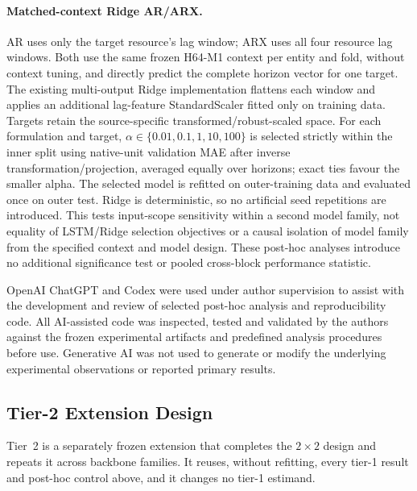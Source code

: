 \documentclass[5p,twocolumn]{elsarticle}
\begin{document}
\paragraph{Matched-context Ridge AR/ARX.}
AR uses only the target resource's lag window; ARX uses all four resource lag
windows. Both use the same frozen H64-M1 context per entity and fold, without
context tuning, and directly predict the complete horizon vector for one
target. The existing multi-output Ridge implementation flattens each window
and applies an additional lag-feature StandardScaler fitted only on training
data. Targets retain the source-specific transformed/robust-scaled space.
For each formulation and target, $\alpha\in\{0.01,0.1,1,10,100\}$ is selected
strictly within the inner split using native-unit validation MAE after inverse
transformation/projection, averaged equally over horizons; exact ties favour
the smaller alpha. The selected model is refitted on outer-training data and
evaluated once on outer test. Ridge is deterministic, so no artificial seed
repetitions are introduced. This tests input-scope sensitivity within a
second model family, not equality of LSTM/Ridge selection objectives or a
causal isolation of model family from the specified context and model design.
These post-hoc analyses introduce no additional significance test or pooled
cross-block performance statistic.

OpenAI ChatGPT and Codex were used under author supervision to assist with the
development and review of selected post-hoc analysis and reproducibility code.
All AI-assisted code was inspected, tested and validated by the authors against
the frozen experimental artifacts and predefined analysis procedures before
use. Generative AI was not used to generate or modify the underlying
experimental observations or reported primary results.

\subsection{Tier-2 Extension Design}
\label{sec:tier2-design}

Tier~2 is a separately frozen extension that completes the $2\times2$ design
and repeats it across backbone families. It reuses, without refitting, every
tier-1 result and post-hoc control above, and it changes no tier-1 estimand.
\end{document}
